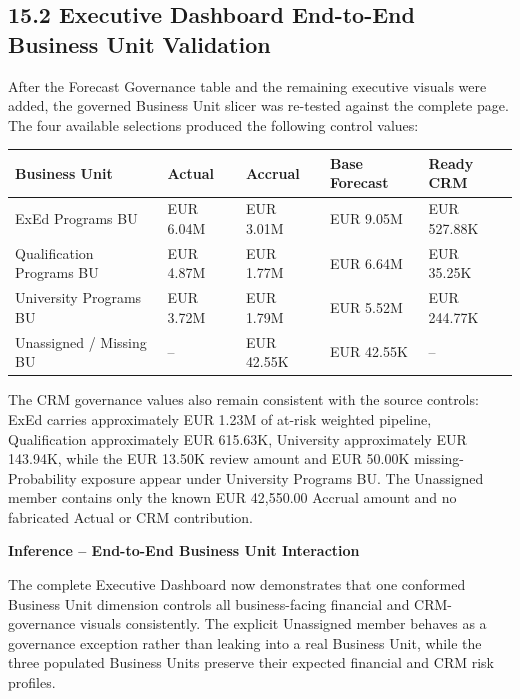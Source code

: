 \documentclass[11pt,a4paper]{article}
\begin{document}
\subsection{15.2 Executive Dashboard End-to-End Business Unit Validation}

After the Forecast Governance table and the remaining executive visuals were added,
the governed Business Unit slicer was re-tested against the complete page. The four
available selections produced the following control values:

\begin{tabularx}{\textwidth}{
    >{\raggedright\arraybackslash}p{3.6cm}
    >{\raggedleft\arraybackslash}p{2.3cm}
    >{\raggedleft\arraybackslash}p{2.3cm}
    >{\raggedleft\arraybackslash}p{2.3cm}
    >{\raggedleft\arraybackslash}X
}

\toprule
Business Unit
&
Actual
&
Accrual
&
Base Forecast
&
Ready CRM
\\
\midrule

ExEd Programs BU
&
EUR 6.04M
&
EUR 3.01M
&
EUR 9.05M
&
EUR 527.88K
\\

Qualification Programs BU
&
EUR 4.87M
&
EUR 1.77M
&
EUR 6.64M
&
EUR 35.25K
\\

University Programs BU
&
EUR 3.72M
&
EUR 1.79M
&
EUR 5.52M
&
EUR 244.77K
\\

Unassigned / Missing BU
&
--
&
EUR 42.55K
&
EUR 42.55K
&
--
\\

\bottomrule
\end{tabularx}

The CRM governance values also remain consistent with the source controls:
ExEd carries approximately EUR 1.23M of at-risk weighted pipeline, Qualification
approximately EUR 615.63K, University approximately EUR 143.94K, while the
EUR 13.50K review amount and EUR 50.00K missing-Probability exposure appear under
University Programs BU. The Unassigned member contains only the known EUR 42,550.00
Accrual amount and no fabricated Actual or CRM contribution.

\begin{inferencebox}
\textbf{Inference -- End-to-End Business Unit Interaction}

The complete Executive Dashboard now demonstrates that one conformed Business Unit
dimension controls all business-facing financial and CRM-governance visuals consistently.
The explicit Unassigned member behaves as a governance exception rather than leaking
into a real Business Unit, while the three populated Business Units preserve their
expected financial and CRM risk profiles.
\end{inferencebox}
\end{document}
